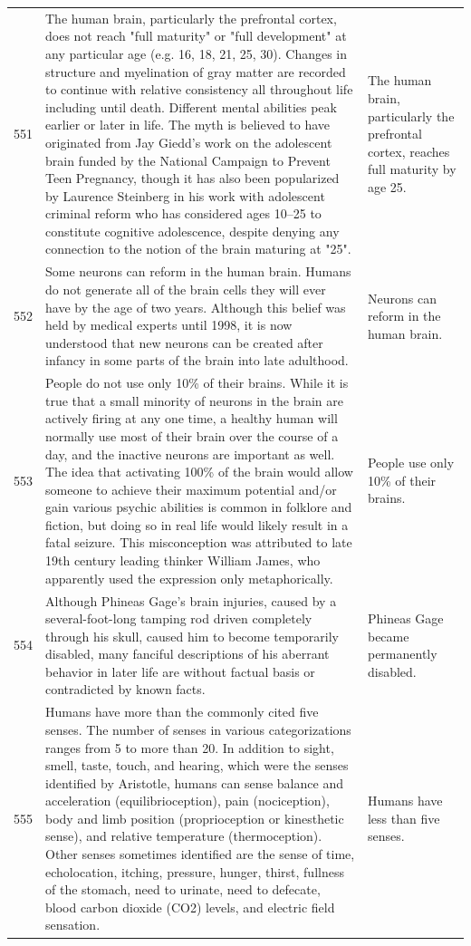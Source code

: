 \begin{tabular}{c|p{}|p{}}
551 & The human brain, particularly the prefrontal cortex, does not reach "full maturity" or "full development" at any particular age (e.g. 16, 18, 21, 25, 30). Changes in structure and myelination of gray matter are recorded to continue with relative consistency all throughout life including until death. Different mental abilities peak earlier or later in life. The myth is believed to have originated from Jay Giedd's work on the adolescent brain funded by the National Campaign to Prevent Teen Pregnancy, though it has also been popularized by Laurence Steinberg in his work with adolescent criminal reform who has considered ages 10–25 to constitute cognitive adolescence, despite denying any connection to the notion of the brain maturing at "25". & The human brain, particularly the prefrontal cortex, reaches full maturity by age 25. \\
552 & Some neurons can reform in the human brain. Humans do not generate all of the brain cells they will ever have by the age of two years. Although this belief was held by medical experts until 1998, it is now understood that new neurons can be created after infancy in some parts of the brain into late adulthood. & Neurons can reform in the human brain. \\
553 & People do not use only 10\% of their brains. While it is true that a small minority of neurons in the brain are actively firing at any one time, a healthy human will normally use most of their brain over the course of a day, and the inactive neurons are important as well. The idea that activating 100\% of the brain would allow someone to achieve their maximum potential and/or gain various psychic abilities is common in folklore and fiction, but doing so in real life would likely result in a fatal seizure. This misconception was attributed to late 19th century leading thinker William James, who apparently used the expression only metaphorically. & People use only 10\% of their brains. \\
554 & Although Phineas Gage's brain injuries, caused by a several-foot-long tamping rod driven completely through his skull, caused him to become temporarily disabled, many fanciful descriptions of his aberrant behavior in later life are without factual basis or contradicted by known facts. & Phineas Gage became permanently disabled. \\
555 & Humans have more than the commonly cited five senses. The number of senses in various categorizations ranges from 5 to more than 20. In addition to sight, smell, taste, touch, and hearing, which were the senses identified by Aristotle, humans can sense balance and acceleration (equilibrioception), pain (nociception), body and limb position (proprioception or kinesthetic sense), and relative temperature (thermoception). Other senses sometimes identified are the sense of time, echolocation, itching, pressure, hunger, thirst, fullness of the stomach, need to urinate, need to defecate, blood carbon dioxide (CO2) levels, and electric field sensation. & Humans have less than five senses. \\

\end{tabular}
